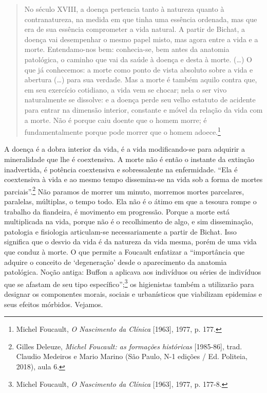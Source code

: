 \begin{quote}
No século XVIII, a doença pertencia tanto à natureza quanto à
contranatureza, na medida em que tinha uma essência ordenada, mas que
era de sua essência comprometer a vida natural. A partir de Bichat, a
doença vai desempenhar o mesmo papel misto, mas agora entre a vida e a
morte. Entendamo-nos bem: conhecia-se, bem antes da anatomia patológica,
o caminho que vai da saúde à doença e desta à morte. (\ldots{}) O que já
conhecemos: a morte como ponto de vista absoluto sobre a vida e abertura
(\ldots{}) para sua verdade. Mas a morte é também aquilo contra que, em
seu exercício cotidiano, a vida vem se chocar; nela o ser vivo
naturalmente se dissolve: e a doença perde seu velho estatuto de
acidente para entrar na dimensão interior, constante e móvel da relação
da vida com a morte. Não é porque caiu doente que o homem morre; é
fundamentalmente porque pode morrer que o homem adoece.\footnote{Michel
  Foucault, \emph{O Nascimento da Clínica} {[}1963{]}, 1977, p. 177.}
\end{quote}

A doença é a dobra interior da vida, é a vida modificando-se para
adquirir a mineralidade que lhe é coextensiva. A morte não é então o
instante da extinção inadvertida, é potência coextensiva e sobressalente
na enfermidade. ``Ela é coextensiva à vida e ao mesmo tempo dissemina-se
na vida sob a forma de mortes parciais''.\footnote{Gilles Deleuze,
  \emph{Michel Foucault: as formações históricas} {[}1985-86{]}, trad.
  Claudio Medeiros e Mario Marino (São Paulo, N-1 edições / Ed.
  Politeia, 2018), aula 6.} Não paramos de morrer um minuto, morremos
mortes parcelares, paralelas, múltiplas, o tempo todo. Ela não é o átimo
em que a tesoura rompe o trabalho da fiandeira, é movimento em
progressão. Porque a morte está multiplicada na vida, porque não é o
recolhimento de algo, e sim disseminação, patologia e fisiologia
articulam-se necessariamente a partir de Bichat. Isso significa que o
desvio da vida é da natureza da vida mesma, porém de uma vida que conduz
à morte. O que permite a Foucault enfatizar a ``importância que adquire
o conceito de `degeneração' desde o aparecimento da anatomia patológica.
Noção antiga: Buffon a aplicava aos indivíduos ou séries de indivíduos
que se afastam de seu tipo específico'';\footnote{Michel Foucault,
  \emph{O Nascimento da Clínica} {[}1963{]}, 1977, p. 177-8.} os
higienistas também a utilizarão para designar os componentes morais,
sociais e urbanísticos que viabilizam epidemias e seus efeitos mórbidos.
Vejamos.

